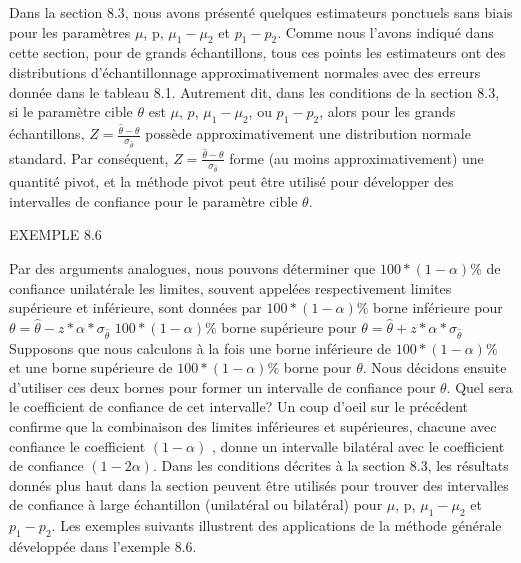 \documentclass[]{article}
\begin{document}
Dans la section 8.3, nous avons présenté quelques estimateurs ponctuels
sans biais pour les paramètres \(\mu\), p, \(\mu_1 - \mu_2\) et
\(p_1 - p_2\). Comme nous l'avons indiqué dans cette section, pour de
grands échantillons, tous ces points les estimateurs ont des
distributions d'échantillonnage approximativement normales avec des
erreurs donnée dans le tableau 8.1. Autrement dit, dans les conditions
de la section 8.3, si le paramètre cible \(\theta\) est \(\mu\), \(p\),
\(\mu_1 - \mu_2\), ou \(p_1 - p_2\), alors pour les grands échantillons,
\(Z = \frac{\widehat{\theta}- \theta}{\sigma_\widehat{\theta}}\) possède
approximativement une distribution normale standard. Par conséquent,
\(Z = \frac{\widehat{\theta}- \theta}{\sigma_\widehat{\theta}}\) forme
(au moins approximativement) une quantité pivot, et la méthode pivot
peut être utilisé pour développer des intervalles de confiance pour le
paramètre cible \(\theta\).

EXEMPLE 8.6

Par des arguments analogues, nous pouvons déterminer que
\(100*(1 − \alpha)\%\) de confiance unilatérale les limites, souvent
appelées respectivement limites supérieure et inférieure, sont données
par \(100*(1 − \alpha)\%\) borne inférieure pour
\(\theta = \widehat{\theta} - z*\alpha*\sigma_\widehat{\theta}\)
\(100*(1 − \alpha)\%\) borne supérieure pour
\(\theta = \widehat{\theta} + z*\alpha*\sigma_\widehat{\theta}\)
Supposons que nous calculons à la fois une borne inférieure de
\(100*(1 − \alpha)\%\) et une borne supérieure de \(100*(1 − \alpha)\%\)
borne pour \(\theta\). Nous décidons ensuite d'utiliser ces deux bornes
pour former un intervalle de confiance pour \(\theta\). Quel sera le
coefficient de confiance de cet intervalle? Un coup d'oeil sur le
précédent confirme que la combinaison des limites inférieures et
supérieures, chacune avec confiance le coefficient \((1-\alpha)\) ,
donne un intervalle bilatéral avec le coefficient de confiance
\((1-2\alpha)\). Dans les conditions décrites à la section 8.3, les
résultats donnés plus haut dans la section peuvent être utilisés pour
trouver des intervalles de confiance à large échantillon (unilatéral ou
bilatéral) pour \(\mu\), p, \(\mu_1 - \mu_2\) et \(p_1 - p_2\). Les
exemples suivants illustrent des applications de la méthode générale
développée dans l'exemple 8.6.
\end{document}
